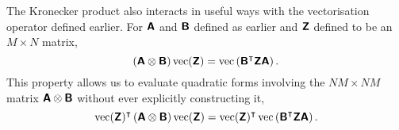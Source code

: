 \documentclass[fleqn,usenatbib]{mnras}
\begin{document}
The Kronecker product also interacts in useful ways with the vectorisation operator defined earlier. For $\textbf{\textsf{A}}$ and $\textbf{\textsf{B}}$ defined as earlier and $\textbf{\textsf{Z}}$ defined to be an $M \times N$ matrix,
\begin{equation}
    \left(\textbf{\textsf{A}} \otimes \textbf{\textsf{B}} \right)\operatorname{vec}(\textbf{\textsf{Z}}) = \operatorname{vec}\left(\textbf{\textsf{B}}^\intercal\textbf{\textsf{Z}}\textbf{\textsf{A}}\right).
\end{equation}
This property allows us to evaluate quadratic forms involving  the $NM \times NM$ matrix $\textbf{\textsf{A}}\otimes\textbf{\textsf{B}}$ without ever explicitly constructing it,
\begin{equation}
    \operatorname{vec}(\textbf{\textsf{Z}})^\intercal\left(\textbf{\textsf{A}} \otimes \textbf{\textsf{B}} \right)\operatorname{vec}(\textbf{\textsf{Z}}) = \operatorname{vec}(\textbf{\textsf{Z}})^\intercal \operatorname{vec}\left(\textbf{\textsf{B}}^\intercal\textbf{\textsf{Z}}\textbf{\textsf{A}}\right).
\end{equation}
\end{document}
